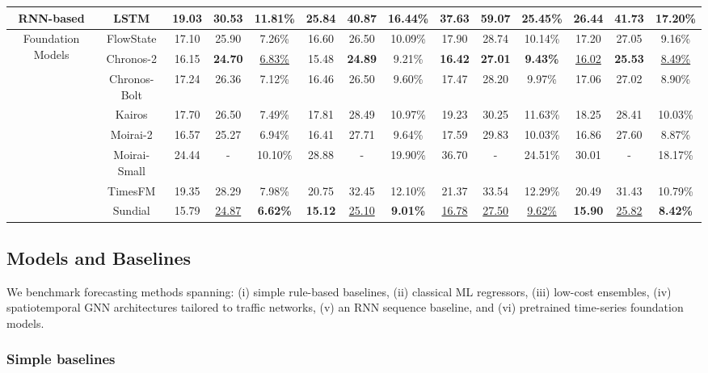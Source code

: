 \documentclass[10pt]{article}
\begin{document}
\begin{table}[t]
{\begin{tabular}{c|c|c|c|c|c|c|c|c|c|c|c|c|c}
\midrule
\multirow{1}{*}{RNN-based}
& LSTM & 19.03 & 30.53 & 11.81\% & 25.84 & 40.87 & 16.44\% & 37.63 & 59.07 & 25.45\% & 26.44 & 41.73 & 17.20\% \\
\midrule
\multirow{8}{*}{Foundation Models}
& FlowState & 17.10 & 25.90 & 7.26\% & 16.60 & 26.50 & 10.09\% & 17.90 & 28.74 & 10.14\% & 17.20 & 27.05 & 9.16\% \\
& Chronos-2 & 16.15 & \textbf{24.70} & \underline{6.83\%} & 15.48 & \textbf{24.89} & 9.21\% & \textbf{16.42} & \textbf{27.01} & \textbf{9.43\%} & \underline{16.02} & \textbf{25.53} & \underline{8.49\%} \\
& Chronos-Bolt & 17.24 & 26.36 & 7.12\% & 16.46 & 26.50 & 9.60\% & 17.47 & 28.20 & 9.97\% & 17.06 & 27.02 & 8.90\% \\
& Kairos & 17.70 & 26.50 & 7.49\% & 17.81 & 28.49 & 10.97\% & 19.23 & 30.25 & 11.63\% & 18.25 & 28.41 & 10.03\% \\
& Moirai-2 & 16.57 & 25.27 & 6.94\% & 16.41 & 27.71 & 9.64\% & 17.59 & 29.83 & 10.03\% & 16.86 & 27.60 & 8.87\% \\
& Moirai-Small & 24.44 & - & 10.10\% & 28.88 & - & 19.90\% & 36.70 & - & 24.51\% & 30.01 & - & 18.17\% \\
& TimesFM & 19.35 & 28.29 & 7.98\% & 20.75 & 32.45 & 12.10\% & 21.37 & 33.54 & 12.29\% & 20.49 & 31.43 & 10.79\% \\
& Sundial & 15.79 & \underline{24.87} & \textbf{6.62\%} & \textbf{15.12} & \underline{25.10} & \textbf{9.01\%} & \underline{16.78} & \underline{27.50} & \underline{9.62\%} & \textbf{15.90} & \underline{25.82} & \textbf{8.42\%} \\
\bottomrule
\end{tabular}
}

\end{table}


\subsection{Models and Baselines}
\label{sec:models}

We benchmark forecasting methods spanning: (i) simple rule-based baselines, (ii) classical ML regressors,
(iii) low-cost ensembles, (iv) spatiotemporal GNN architectures tailored to traffic networks, (v) an RNN
sequence baseline, and (vi) pretrained time-series foundation models.

\subsubsection{Simple baselines}
\end{document}
